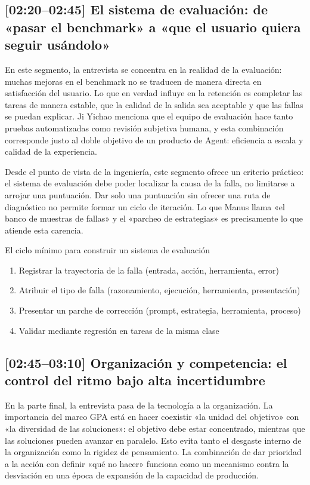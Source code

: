 \subsection{[02:20--02:45] El sistema de evaluación: de «pasar el benchmark» a «que el usuario quiera seguir usándolo»}

En este segmento, la entrevista se concentra en la realidad de la evaluación: muchas mejoras en el benchmark no se traducen de manera directa en satisfacción del usuario. Lo que en verdad influye en la retención es completar las tareas de manera estable, que la calidad de la salida sea aceptable y que las fallas se puedan explicar. Ji Yichao menciona que el equipo de evaluación hace tanto pruebas automatizadas como revisión subjetiva humana, y esta combinación corresponde justo al doble objetivo de un producto de Agent: eficiencia a escala y calidad de la experiencia.

Desde el punto de vista de la ingeniería, este segmento ofrece un criterio práctico: el sistema de evaluación debe poder localizar la causa de la falla, no limitarse a arrojar una puntuación. Dar solo una puntuación sin ofrecer una ruta de diagnóstico no permite formar un ciclo de iteración. Lo que Manus llama «el banco de muestras de fallas» y el «parcheo de estrategias» es precisamente lo que atiende esta carencia.

\begin{importantbox}{El ciclo mínimo para construir un sistema de evaluación}
\begin{enumerate}
    \item Registrar la trayectoria de la falla (entrada, acción, herramienta, error)
    \item Atribuir el tipo de falla (razonamiento, ejecución, herramienta, presentación)
    \item Presentar un parche de corrección (prompt, estrategia, herramienta, proceso)
    \item Validar mediante regresión en tareas de la misma clase
\end{enumerate}
\end{importantbox}

\subsection{[02:45--03:10] Organización y competencia: el control del ritmo bajo alta incertidumbre}

En la parte final, la entrevista pasa de la tecnología a la organización. La importancia del marco GPA está en hacer coexistir «la unidad del objetivo» con «la diversidad de las soluciones»: el objetivo debe estar concentrado, mientras que las soluciones pueden avanzar en paralelo. Esto evita tanto el desgaste interno de la organización como la rigidez de pensamiento. La combinación de dar prioridad a la acción con definir «qué no hacer» funciona como un mecanismo contra la desviación en una época de expansión de la capacidad de producción.

